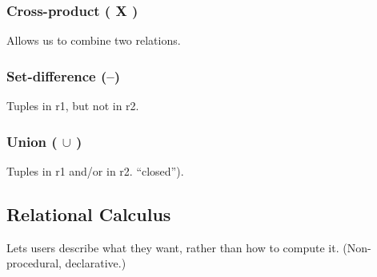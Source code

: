 \documentclass[11pt]{article}
\begin{document}
\subsubsection{Cross-product ( X )}
\label{sec:org5d91e20}
Allows us to combine two relations.
\subsubsection{Set-difference (–)}
\label{sec:org46cb71e}
Tuples in r1, but not in r2.
\subsubsection{Union ( \(\cup\) )}
\label{sec:orge660747}
Tuples in r1 and/or in r2.
  “closed”).
\subsection{Relational Calculus}
\label{sec:org5307dad}
Lets users describe what they want, rather than how to compute it.
(Non-procedural, declarative.)
\end{document}
